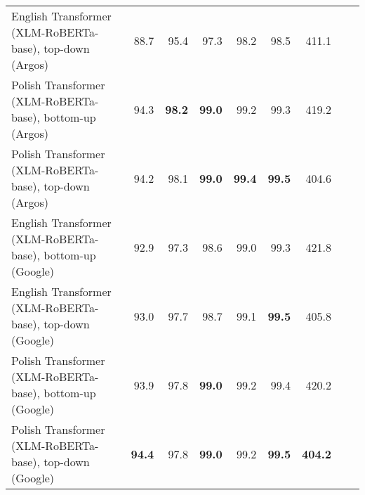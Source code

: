 \begin{table}[ht!]
{\begin{tabular}{lrrrrrrrr}
  English Transformer (XLM-RoBERTa-base), top-down (Argos) & 88.7 & 95.4 & 97.3 & 98.2 & 98.5 & 411.1 \\ 
  Polish Transformer (XLM-RoBERTa-base), bottom-up (Argos) & 94.3 & \textbf{98.2} & \textbf{99.0} & 99.2 & 99.3 & 419.2 \\ 
  Polish Transformer (XLM-RoBERTa-base), top-down (Argos) & 94.2 & 98.1 & \textbf{99.0} & \textbf{99.4} & \textbf{99.5} & 404.6 \\ 
  English Transformer (XLM-RoBERTa-base), bottom-up (Google) & 92.9 & 97.3 & 98.6 & 99.0 & 99.3 & 421.8 \\ 
  English Transformer (XLM-RoBERTa-base), top-down (Google) & 93.0 & 97.7 & 98.7 & 99.1 & \textbf{99.5} & 405.8 \\ 
  Polish Transformer (XLM-RoBERTa-base), bottom-up (Google) & 93.9 & 97.8 & \textbf{99.0} & 99.2 & 99.4 & 420.2 \\ 
  Polish Transformer (XLM-RoBERTa-base), top-down (Google) & \textbf{94.4} & 97.8 & \textbf{99.0} & 99.2 & \textbf{99.5} & \textbf{404.2} \\ 
   \hline
\end{tabular}
}
\end{table}




